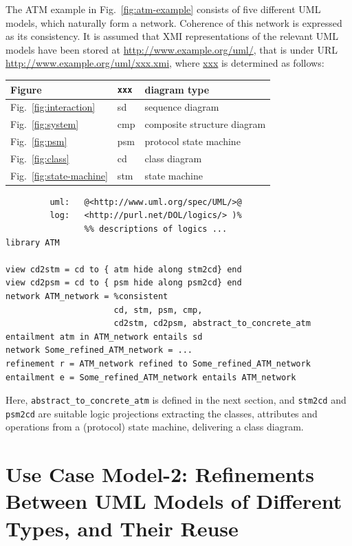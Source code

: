 \documentclass[10pt,fleqn,final]{scrreprt}
\newenvironment{definitions}[0]{\medskip }{}
\begin{document}
\begin{definitions}
The ATM example in Fig.~\ref{fig:atm-example} consists of five different
UML models, which naturally form a network. Coherence of this network
is expressed as its consistency. 
It is assumed that XMI representations of the
relevant UML models have been stored at
\url{http://www.example.org/uml/}, that is under URL
\url{http://www.example.org/uml/xxx.xmi}, where \url{xxx} is
determined as follows:\medskip

\begin{tabular}{|l|l|l|}\hline
\textbf{Figure} & \textbf{\texttt{xxx}} & \textbf{diagram type}\\\hline
Fig.~\ref{fig:interaction} & sd & sequence diagram\\\hline
Fig.~\ref{fig:system} & cmp & composite structure diagram\\\hline
Fig.~\ref{fig:psm} & psm & protocol state machine\\\hline
Fig.~\ref{fig:class} & cd & class diagram\\\hline
Fig.~\ref{fig:state-machine} & stm & state machine\\\hline
\end{tabular}

\begin{lstlisting}[basicstyle=\ttfamily,language=dolText,escapechar=@,mathescape]
%prefix( :      <http://www.example.org/uml/>
         uml:   @<http://www.uml.org/spec/UML/>@
         log:   <http://purl.net/DOL/logics/> )%
                %% descriptions of logics ...
library ATM

view cd2stm = cd to { atm hide along stm2cd} end
view cd2psm = cd to { psm hide along psm2cd} end
network ATM_network = %consistent
                      cd, stm, psm, cmp,
                      cd2stm, cd2psm, abstract_to_concrete_atm
entailment atm in ATM_network entails sd
network Some_refined_ATM_network = ...
refinement r = ATM_network refined to Some_refined_ATM_network
entailment e = Some_refined_ATM_network entails ATM_network
\end{lstlisting}
Here, \texttt{abstract\_to\_concrete\_atm} is defined in the next
section, and \texttt{stm2cd} and \texttt{psm2cd} are suitable logic
projections extracting the classes, attributes and operations from a
(protocol) state machine, delivering a class diagram.

\section{Use Case Model-2: Refinements Between UML Models of Different Types, and Their Reuse}
\label{model-2}


\end{definitions}
\end{document}
